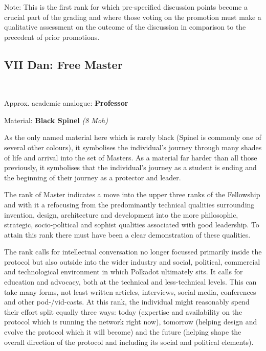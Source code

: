 \documentclass[9pt,oneside]{amsart}
\begin{document}
Note: This is the first rank for which pre-specified discussion points become a crucial part of the grading and where those voting on the promotion must make a qualitative assessment on the outcome of the discussion in comparison to the precedent of prior promotions.

\subsection{VII Dan: Free Master}\label{vii-dan-free-master}~\\


Approx. academic analogue: \textbf{Professor}

Material: \textbf{Black Spinel} \emph{(8 Moh)}

As the only named material here which is rarely black (Spinel is commonly one of several other colours), it symbolises the individual's journey through many shades of life and arrival into the set of Masters. As a material far harder than all those previously, it symbolises that the individual's journey as a student is ending and the beginning of their journey as a protector and leader.

The rank of Master indicates a move into the upper three ranks of the Fellowship and with it a refocusing from the predominantly technical qualities surrounding invention, design, architecture and development into the more philosophic, strategic, socio-political and sophist qualities associated with good leadership. To attain this rank there must have been a clear demonstration of these qualities.

The rank calls for intellectual conversation no longer focussed primarily inside the protocol but also outside into the wider industry and social, political, commercial and technological environment in which Polkadot ultimately sits. It calls for education and advocacy, both at the technical and less-technical levels. This can take many forms, not least written articles, interviews, social media, conferences and other pod-/vid-casts. At this rank, the individual might reasonably spend their effort split equally three ways: today (expertise and availability on the protocol which is running the network right now), tomorrow (helping design and evolve the protocol which it will become) and the future (helping shape the overall direction of the protocol and including its social and political elements).
\end{document}

